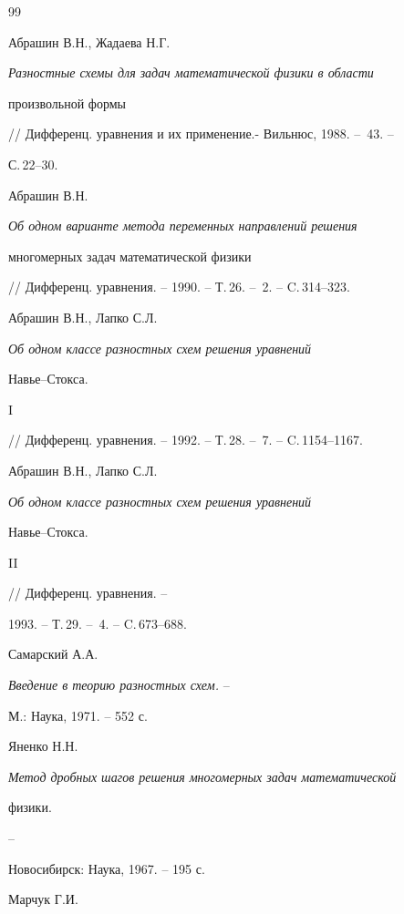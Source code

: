 \begin{thebibliography}{99}







Абрашин В.Н., Жадаева Н.Г.


{\it Разностные схемы для задач математической физики в области


произвольной формы}


// Дифференц. уравнения и их применение.- Вильнюс, 1988. -- \No\,43. --


С.\,22--30.




Абрашин В.Н.


{\it Об одном варианте метода переменных направлений решения


многомерных задач математической физики}


// Дифференц. уравнения. -- 1990. -- Т.\,26. -- \No\,2. -- C.\,314--323.




Абрашин В.Н., Лапко С.Л.


{\it Об одном классе разностных схем решения уравнений


Навье--Стокса.} I


// Дифференц. уравнения. -- 1992. -- Т.\,28. -- \No\,7. -- C.\,1154--1167.




Абрашин В.Н., Лапко С.Л.


{\it Об одном классе разностных схем решения уравнений


Навье--Стокса.} II


// Дифференц. уравнения. --


1993. -- Т.\,29. -- \No\,4. -- C.\,673--688.




Самарский А.А.


{\it Введение в теорию разностных схем.} --


М.: Наука, 1971. -- 552 с.




Яненко Н.Н.


{\it Метод дробных шагов решения многомерных задач математической


физики.} --


Новосибирск: Наука, 1967. -- 195 с.




Марчук Г.И.



\end{thebibliography}
